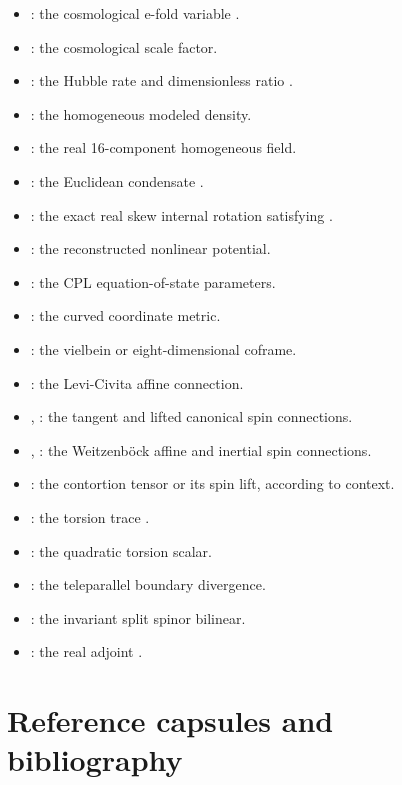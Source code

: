 \documentclass[11pt]{article}
\begin{document}
\begin{itemize}
\item \texttt{}: the cosmological e-fold variable \texttt{}.
\item \texttt{}: the cosmological scale factor.
\item \texttt{}: the Hubble rate and dimensionless ratio \texttt{}.
\item \texttt{}: the homogeneous modeled density.
\item \texttt{}: the real 16-component homogeneous field.
\item \texttt{}: the Euclidean condensate \texttt{}.
\item \texttt{}: the exact real skew internal rotation satisfying \texttt{}.
\item \texttt{}: the reconstructed nonlinear potential.
\item \texttt{}: the CPL equation-of-state parameters.
\item \texttt{}: the curved coordinate metric.
\item \texttt{}: the vielbein or eight-dimensional coframe.
\item \texttt{}: the Levi-Civita affine connection.
\item \texttt{}, \texttt{}: the tangent and lifted canonical spin connections.
\item \texttt{}, \texttt{}: the Weitzenböck affine and inertial spin connections.
\item \texttt{}: the contortion tensor or its spin lift, according to context.
\item \texttt{}: the torsion trace \texttt{}.
\item \texttt{}: the quadratic torsion scalar.
\item \texttt{}: the teleparallel boundary divergence.
\item \texttt{}: the invariant split spinor bilinear.
\item \texttt{}: the real adjoint \texttt{}.
\end{itemize}

\section{Reference capsules and bibliography}
\end{document}
